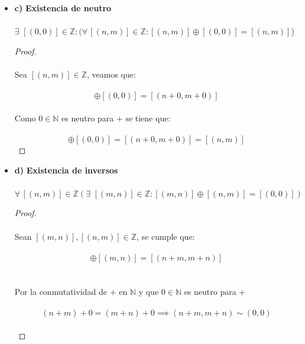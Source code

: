 \documentclass[11pt,letterpaper]{article}
\newcommand{\N}{\mathbb{N}}
\newcommand{\Z}{\mathbb{Z}}
\begin{document}
\begin{itemize}
\begin{proof}
\begin{align*}
            \,\\
            =[((n+r)+t,(m+s)+u)]=(\,[(n,m)]\oplus[(r,s)]\,)\oplus[(t,u)]
        \end{align*}
        \end{proof}
        \item \textbf{c)\,\,Existencia de neutro}\,\\
        \,\\
        $\exists\,\,[(0,0)]\in \Z:(\forall\,[(n,m)]\in \Z:[(n,m)]\oplus[(0,0)]=[(n,m)]$)
        \begin{proof}\,\\
        \,\\
        Sea $[(n,m)]\in \Z$, veamos que:\,\\
        \,\\
        \begin{equation*}
            [(n,m)]\oplus [(0,0)]=[(n+0,m+0)]
        \end{equation*}\,\\
        Como $0\in \N$ es neutro para $+$ se tiene que:\,\\
        \,\\
        \begin{equation*}
            [(n,m)]\oplus[(0,0)]=[(n+0,m+0)]=[(n,m)]
        \end{equation*}
         \end{proof}
        \item \textbf{d)\,\,Existencia de inversos}\,\\
        \,\\
        $\forall\,[(n,m)]\in \Z(\exists\,\,[(m,n)]\in \Z: [(m,n)]\oplus [(n,m)]=[(0,0)])$
        \begin{proof}\,\\
        \,\\
        Sean $[(m,n)],[(n,m)]\in \Z$, se cumple que:\,\\
        \,\\
        \begin{equation*}
            [(n,m)]\oplus[(m,n)]=[(n+m,m+n)]
        \end{equation*}\,\\
        \,\\
        Por la conmutatividad de $+$ en $\N$ y que $0\in \N$ es neutro para $+$\,\\
        \,\\
        \begin{equation*}
            (n+m)+0=(m+n)+0\implies (n+m,m+n)\sim(0,0)
        \end{equation*}\,\\

\end{proof}
\end{itemize}
\end{document}
